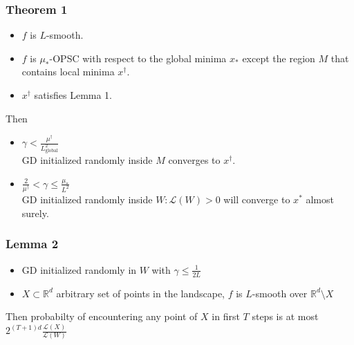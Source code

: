 \documentclass{beamer}
\begin{document}
\begin{frame}
\frametitle{Theorem 1}
\begin{itemize}
	\item $f$ is $L$-smooth.
	\item $f$ is $\mu_\ast$-OPSC with respect to the 
	 global minima $x_\ast$ except the region $M$ that 
	 contains local minima $x^\dagger$.
	\item $x^\dagger$ satisfies Lemma 1.
\end{itemize}
Then
\begin{itemize}
	\item $\gamma < \frac{\mu^{\dagger}}{L^2_{\text{global}}}$\\
	GD initialized randomly inside $M$ converges to $x^\dagger$.
	\item $\frac{2}{\mu^{\dagger}} < \gamma \leq \frac{\mu_\ast}{L^2}$ \\
	GD initialized randomly inside $W: \mathcal{L}(W) > 0$ 
	will converge to $x^\ast$ almost surely.
\end{itemize}

\end{frame}

\begin{frame}
\frametitle{Lemma 2}
\begin{itemize}
	\item GD initialized randomly in $W$ with $\gamma \leq \frac{1}{2L}$
	\item $X \subset \mathbb{R}^d$ arbitrary set of points in the landscape, $f$ is $L$-smooth over $\mathbb{R}^d \setminus X$
\end{itemize}

Then probabilty of encountering 
 any point of $X$ in first $T$ steps is 
 at most $2 ^ {(T + 1)d} \frac{\mathcal{L}(X)}{\mathcal{L}(W)}$
\end{frame}
\end{document}

